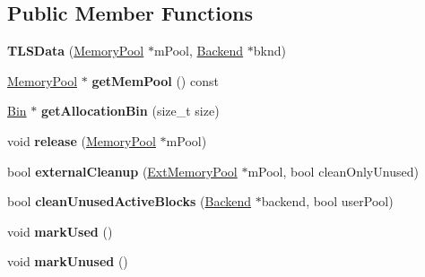 \subsection*{Public Member Functions}
\begin{DoxyCompactItemize}
\item 
\hypertarget{classrml_1_1internal_1_1TLSData_a490eaf67a7d5bc706cb128d5f39f051d}{}{\bfseries T\+L\+S\+Data} (\hyperlink{classrml_1_1internal_1_1MemoryPool}{Memory\+Pool} $\ast$m\+Pool, \hyperlink{classrml_1_1internal_1_1Backend}{Backend} $\ast$bknd)\label{classrml_1_1internal_1_1TLSData_a490eaf67a7d5bc706cb128d5f39f051d}

\item 
\hypertarget{classrml_1_1internal_1_1TLSData_a5006bb0dd04220f2d73a55879894bf22}{}\hyperlink{classrml_1_1internal_1_1MemoryPool}{Memory\+Pool} $\ast$ {\bfseries get\+Mem\+Pool} () const \label{classrml_1_1internal_1_1TLSData_a5006bb0dd04220f2d73a55879894bf22}

\item 
\hypertarget{classrml_1_1internal_1_1TLSData_a26c607a6304c0fa325c6604cf7c767ea}{}\hyperlink{classrml_1_1internal_1_1Bin}{Bin} $\ast$ {\bfseries get\+Allocation\+Bin} (size\+\_\+t size)\label{classrml_1_1internal_1_1TLSData_a26c607a6304c0fa325c6604cf7c767ea}

\item 
\hypertarget{classrml_1_1internal_1_1TLSData_a9e0f7f9cdd4dfce3a3d4a50fa31e96bc}{}void {\bfseries release} (\hyperlink{classrml_1_1internal_1_1MemoryPool}{Memory\+Pool} $\ast$m\+Pool)\label{classrml_1_1internal_1_1TLSData_a9e0f7f9cdd4dfce3a3d4a50fa31e96bc}

\item 
\hypertarget{classrml_1_1internal_1_1TLSData_a066b64dd8e271ddd9bae9001ad117e5d}{}bool {\bfseries external\+Cleanup} (\hyperlink{structrml_1_1internal_1_1ExtMemoryPool}{Ext\+Memory\+Pool} $\ast$m\+Pool, bool clean\+Only\+Unused)\label{classrml_1_1internal_1_1TLSData_a066b64dd8e271ddd9bae9001ad117e5d}

\item 
\hypertarget{classrml_1_1internal_1_1TLSData_a7a9f13c2700161039dfb21c2c6777a2f}{}bool {\bfseries clean\+Unused\+Active\+Blocks} (\hyperlink{classrml_1_1internal_1_1Backend}{Backend} $\ast$backend, bool user\+Pool)\label{classrml_1_1internal_1_1TLSData_a7a9f13c2700161039dfb21c2c6777a2f}

\item 
\hypertarget{classrml_1_1internal_1_1TLSData_afabda6a63ddb1942d1d5a7a06f41e2ae}{}void {\bfseries mark\+Used} ()\label{classrml_1_1internal_1_1TLSData_afabda6a63ddb1942d1d5a7a06f41e2ae}

\item 
\hypertarget{classrml_1_1internal_1_1TLSData_a2dbe4c6ad60bc541ce0bff6274fa35b0}{}void {\bfseries mark\+Unused} ()\label{classrml_1_1internal_1_1TLSData_a2dbe4c6ad60bc541ce0bff6274fa35b0}

\end{DoxyCompactItemize}
